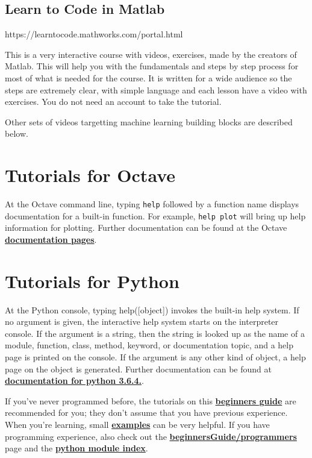 \documentclass[11pt]{article}
\begin{document}
\subsection{Learn to Code in Matlab}\label{learn-to-code-in-matlab}

 https://learntocode.mathworks.com/portal.html

This is a very interactive course with videos, exercises, made by the
creators of Matlab. This will help you with the fundamentals and steps
by step process for most of what is needed for the course. It is written
for a wide audience so the steps are extremely clear, with simple
language and each lesson have a video with exercises. You do not need an
account to take the tutorial.

Other sets of videos targetting machine learning building blocks are
described below.

\section{Tutorials for Octave}\label{tutorials-for-octave}

At the Octave command line, typing \texttt{help} followed by a function
name displays documentation for a built-in function. For example,
\texttt{help\ plot} will bring up help information for plotting. Further
documentation can be found at the Octave
\textbf{\href{http://www.gnu.org/software/octave/doc/interpreter/}{documentation
pages}}.

\section{Tutorials for Python}\label{tutorials-for-python}

At the Python console, typing help({[}object{]}) invokes the built-in
help system. If no argument is given, the interactive help system starts
on the interpreter console. If the argument is a string, then the string
is looked up as the name of a module, function, class, method, keyword,
or documentation topic, and a help page is printed on the console. If
the argument is any other kind of object, a help page on the object is
generated. Further documentation can be found at
\textbf{\href{https://docs.python.org/3/}{documentation for python
3.6.4.}}.

If you've never programmed before, the tutorials on this
\textbf{\href{https://wiki.python.org/moin/BeginnersGuide/NonProgrammers}{beginners
guide}} are recommended for you; they don't assume that you have
previous experience. When you're learning, small
\textbf{\href{https://wiki.python.org/moin/BeginnersGuide/Examples}{examples}}
can be very helpful. If you have programming experience, also check out
the
\textbf{\href{https://wiki.python.org/moin/BeginnersGuide/Programmers}{beginnersGuide/programmers}}
page and the
\textbf{\href{https://docs.python.org/3/py-modindex.html}{python module
index}}.
\end{document}
